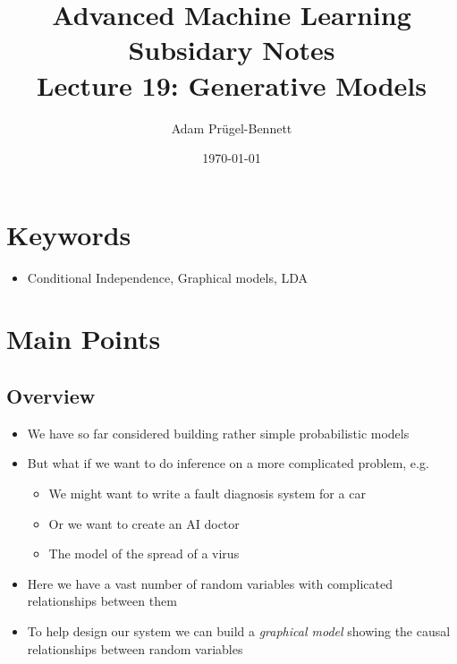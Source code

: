 \documentclass[11pt]{article}
\author{Adam Prügel-Bennett}
\date{\today}
\title{Advanced Machine Learning Subsidary Notes\\\medskip
\large Lecture 19: Generative Models}
\begin{document}
\maketitle

\section{Keywords}
\label{sec:org6ff2ae7}
\begin{itemize}
\item Conditional Independence, Graphical models, LDA
\end{itemize}

\section{Main Points}
\label{sec:orgcd31aee}


\subsection{Overview}
\label{sec:org9266360}
\begin{itemize}
\item We have so far considered building rather simple probabilistic models
\item But what if we want to do inference on a more complicated
problem, e.g.
\begin{itemize}
\item We might want to write a fault diagnosis system for a car
\item Or we want to create an AI doctor
\item The model of the spread of a virus
\end{itemize}
\item Here we have a vast number of random variables with complicated
relationships between them
\item To help design our system we can build a \emph{graphical model}
showing the causal relationships between random variables
\end{itemize}
\end{document}
